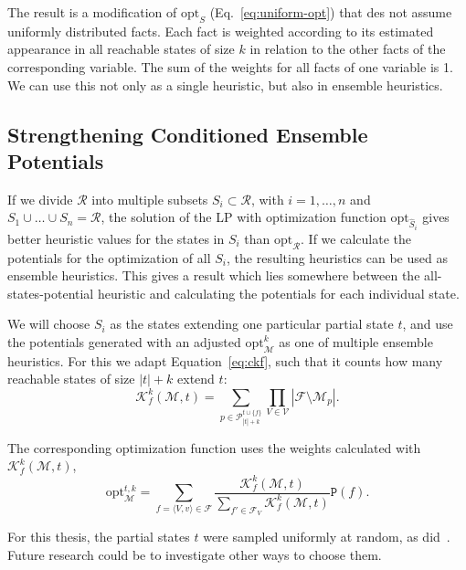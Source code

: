 The result is a modification of $\mathrm{opt}_S$ (Eq.~\eqref{eq:uniform-opt}) that des not assume uniformly distributed facts.
Each fact is weighted according to its estimated appearance in all reachable states of size $k$ in relation to the other facts of the corresponding variable.
The sum of the weights for all facts of one variable is 1.
We can use this not only as a single heuristic, but also in ensemble heuristics.

\subsection{Strengthening Conditioned Ensemble Potentials}\label{subsec:strengthening-conditioned-ensemble}
If we divide $\mathcal{R}$ into multiple subsets $S_i\subset\mathcal{R}$, with $i=1,\dots,n$ and $S_1\cup\dots\cup S_n=\mathcal{R}$, the solution of the LP with optimization function $\mathrm{opt}_{\hat{S}_i}$ gives better heuristic values for the states in $S_i$ than $\mathrm{opt}_\mathcal{R}$.
If we calculate the potentials for the optimization of all $S_i$, the resulting heuristics can be used as ensemble heuristics.
This gives a result which lies somewhere between the all-states-potential heuristic and calculating the potentials for each individual state.

We will choose $S_i$ as the states extending one particular partial state $t$, and use the potentials generated with an adjusted $\mathrm{opt}^k_\mathcal{M}$ as one of multiple ensemble heuristics.
For this we adapt Equation~\eqref{eq:ckf}, such that it counts how many reachable states of size $|t| + k$ extend $t$:
\begin{equation}
    \mathcal{K}^k_f(\mathcal{M}, t) = \sum_{p\in\mathcal{P}^{t\cup\{f\}}_{|t|+k}}\prod_{V\in\mathcal{V}}|\mathcal{F}\setminus\mathcal{M}_p|.
\end{equation}

The corresponding optimization function uses the weights calculated with $\mathcal{K}^k_f(\mathcal{M}, t)$,
\begin{equation}
    \mathrm{opt}^{t,k}_\mathcal{M}=\sum_{f=\langle V,v \rangle\in\mathcal{F}}\frac{\mathcal{K}^k_f(\mathcal{M}, t)}{\sum_{f'\in\mathcal{F}_V}\mathcal{K}^k_f(\mathcal{M}, t)}\mathtt{P}(f).
    \label{eq:opt2}
\end{equation}

For this thesis, the partial states $t$ were sampled uniformly at random, as did~\cite{fivser2020strengthening}.
Future research could be to investigate other ways to choose them.

